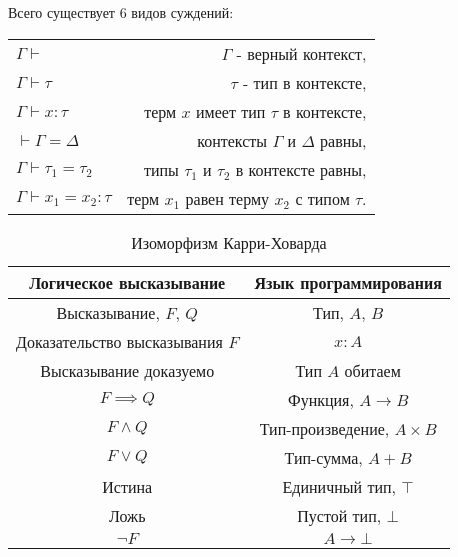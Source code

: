 Всего существует 6 видов суждений:

\begin{table}[h]
    \centering
    \label{tab:types_of_judgments}
    \begin{tabular}{l r}
        $\Gamma \vdash$                  & $\Gamma$ - верный контекст,                  \\
        $\Gamma \vdash \tau$             & $\tau$ - тип в контексте,                    \\
        $\Gamma \vdash x: \tau$          & терм $x$ имеет тип $\tau$ в контексте,       \\
        $\vdash \Gamma = \Delta$         & контексты $\Gamma$ и $\Delta$ равны,         \\
        $\Gamma \vdash \tau_1 = \tau_2$  & типы $\tau_1$ и $\tau_2$ в контексте равны,  \\
        $\Gamma \vdash x_1 = x_2 : \tau$ & терм $x_1$ равен терму $x_2$ с типом $\tau$.
    \end{tabular}
\end{table}

\begin{table}[h]
    \centering
    \caption{Изоморфизм Карри-Ховарда}
    \label{tab:curry-hovard-iso}
    \begin{tabular}{|c|c|}
        \hline
        \textbf{Логическое высказывание} & \textbf{Язык программирования} \\\hline
        Высказывание, $F$, $Q$           & Тип, $A$, $B$                  \\\hline
        Доказательство высказывания $F$  & $x: A$                         \\\hline
        Высказывание доказуемо           & Тип $A$ обитаем                \\\hline
        $F \implies Q$                   & Функция, $A \to B$             \\\hline
        $F \wedge Q$                     & Тип-произведение, $A \times B$ \\\hline
        $F \vee Q$                       & Тип-сумма, $A + B$             \\\hline
        Истина                           & Единичный тип, $\top$          \\\hline
        Ложь                             & Пустой тип, $\bot$             \\\hline
        $\neg F$                         & $A \to \bot$                   \\\hline
    \end{tabular}
\end{table}

